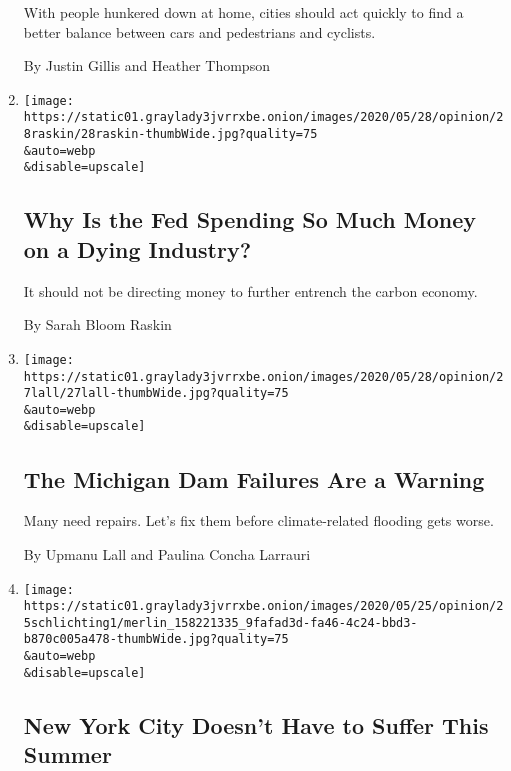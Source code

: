 \begin{enumerate}
  With people hunkered down at home, cities should act quickly to find a
  better balance between cars and pedestrians and cyclists.

  By Justin Gillis and Heather Thompson
\item
  \href{/2020/05/28/opinion/fed-fossil-fuels.html}{}

  \texttt{[image: https://static01.graylady3jvrrxbe.onion/images/2020/05/28/opinion/28raskin/28raskin-thumbWide.jpg?quality=75\\\&auto=webp\\\&disable=upscale]}

  \hypertarget{why-is-the-fed-spending-so-much-money-on-a-dying-industry}{%
  \subsection{Why Is the Fed Spending So Much Money on a Dying
  Industry?}\label{why-is-the-fed-spending-so-much-money-on-a-dying-industry}}

  It should not be directing money to further entrench the carbon
  economy.

  By Sarah Bloom Raskin
\item
  \href{/2020/05/27/opinion/michigan-edenville-dam.html}{}

  \texttt{[image: https://static01.graylady3jvrrxbe.onion/images/2020/05/28/opinion/27lall/27lall-thumbWide.jpg?quality=75\\\&auto=webp\\\&disable=upscale]}

  \hypertarget{the-michigan-dam-failures-are-a-warning}{%
  \subsection{The Michigan Dam Failures Are a
  Warning}\label{the-michigan-dam-failures-are-a-warning}}

  Many need repairs. Let's fix them before climate-related flooding gets
  worse.

  By Upmanu Lall and Paulina Concha Larrauri
\item
  \href{/2020/05/25/opinion/new-york-summer-coronavirus.html}{}

  \texttt{[image: https://static01.graylady3jvrrxbe.onion/images/2020/05/25/opinion/25schlichting1/merlin\_158221335\_9fafad3d-fa46-4c24-bbd3-b870c005a478-thumbWide.jpg?quality=75\\\&auto=webp\\\&disable=upscale]}

  \hypertarget{new-york-city-doesnt-have-to-suffer-this-summer}{%
  \subsection{New York City Doesn't Have to Suffer This
  Summer}\label{new-york-city-doesnt-have-to-suffer-this-summer}}


\end{enumerate}
